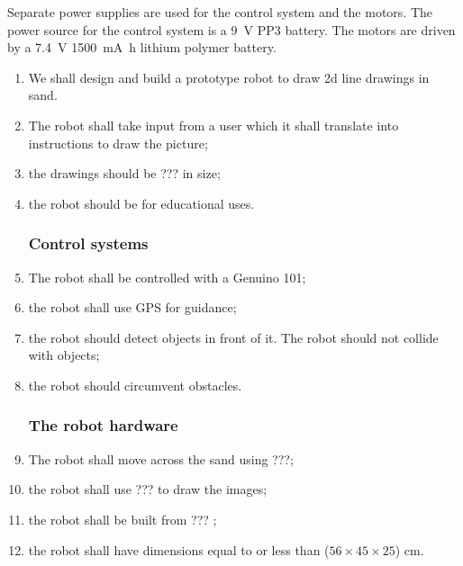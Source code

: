 
    Separate power supplies are used for the control system and the motors. The power source for the control system is a \SI{9}{\volt} PP3 battery. The motors are driven by a \SI{7.4}{\volt} \SI{1500}{\milli\ampere\hour} lithium polymer battery.


    \label{outline specification}
        \begin{enumerate} %
            \subsubsection{The project}
            \item We shall design and build a prototype robot to draw 2d line drawings in sand.\label{spec: draw}
            \item The robot shall take input from a user which it shall translate into instructions to draw the picture;\label{spec: take input}
            \item the drawings should be ???  in size; \label{spec: drawing size}
            \item the robot should be for educational uses. \label{spec: education}

            \subsubsection{Control systems}
            \item The robot shall be controlled with a \gls{Genuino} 101; \label{spec: arduino}
            \item the robot shall use \gls{GPS} for guidance; \label{spec: gps}
            \item the robot should detect objects in front of it. The robot should not collide with objects; \label{spec: detect objects}
            \item the robot should circumvent obstacles.\label{spec: circumvent}

            \subsubsection{The robot hardware}
            \item The robot shall move across the sand using ???; \label{spec: movement}
            \item the robot shall use ???  to draw the images; \label{spec: tool}
            \item the robot shall be built from ??? ; \label{spec: material}
            \item the robot shall have dimensions equal to or less than ($56 \times 45 \times 25$) cm. \label{spec: robot size}


\end{enumerate}
